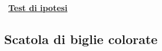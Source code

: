 \documentclass[11pt,openany]{book}
\begin{document}

\clearpage\
\hfill\textbf{{\color{brown}\hyperref[test_ipotesi]{Test di ipotesi \faShare}}}
\subsection{Scatola di biglie colorate}
\label{Scatola di biglie colorate}
\end{document}
